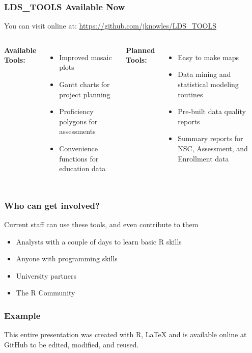 \documentclass{beamer}
\begin{document}
\begin{frame}
\frametitle{LDS\_TOOLS Available Now}
You can visit online at: \textcolor{blue}{\href{https://github.com/jknowles/LDS_TOOLS}{https://github.com/jknowles/LDS\_TOOLS}}
\vspace{.1in}
\begin{columns}
  \textbf{Available Tools:}
    \begin{itemize}
      \item Improved mosaic plots
      \item Gantt charts for project planning
      \item Proficiency polygons for assessments
      \item Convenience functions for education data
    \end{itemize}
  \textbf{Planned Tools:}
    \begin{itemize}
      \item Easy to make maps
      \item Data mining and statistical modeling routines
      \item Pre-built data quality reports
      \item Summary reports for NSC, Assessment, and Enrollment data
    \end{itemize}
\end{columns}
\end{frame}


\begin{frame}
\frametitle{Who can get involved?}
\Large Current staff can use these tools, and even contribute to them
\normalsize
\begin{itemize}
  \item Analysts with a couple of days to learn basic R skills
  \item Anyone with programming skills
  \item University partners
  \item The R Community
\end{itemize}
\end{frame}



\begin{frame}
\frametitle{Example}
\vspace{.6in}
\large This entire presentation was created with R, \LaTeX{} and is available online at GitHub to be edited, modified, and reused. 
\end{frame}
\end{document}
